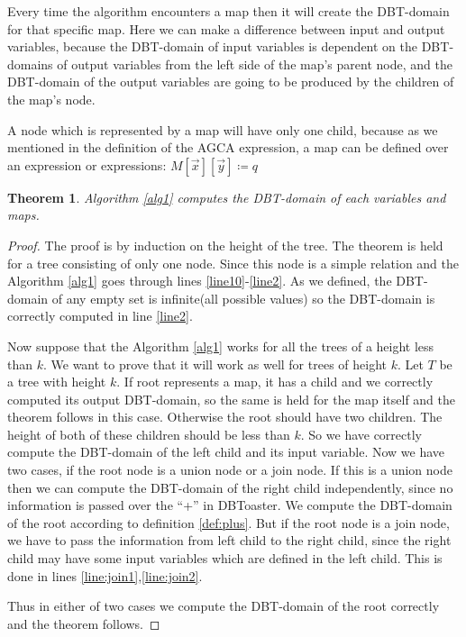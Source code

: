 \documentclass[12pt]{article}
\newtheorem{theorem}{Theorem}[section]
\begin{document}
Every time the algorithm encounters a map then it will create the DBT-domain for that specific map. Here we can make a difference between input and output variables, because the DBT-domain of input variables is dependent on the DBT-domains of output variables from the left side of the map's parent node, and the DBT-domain of the output variables are going to be produced by the children of the map's node. %

A node which is represented by a map will have only one child, because as we mentioned in the definition of the AGCA expression, a map can be defined over an expression or expressions: $M[\vec{x}][\vec{y}]\coloneqq q$
\begin{theorem}
Algorithm \ref{alg1} computes the DBT-domain of each variables and maps.
\end{theorem}

\begin{proof}
The proof is by induction on the height of the tree. The theorem is held for a tree consisting of only one node. Since this node is a simple relation and the Algorithm \ref{alg1} goes  through lines \ref{line10}-\ref{line2}. As we defined, the DBT-domain of any empty set is infinite(all possible values) so the DBT-domain is correctly computed in line \ref{line2}.

Now suppose that the Algorithm \ref{alg1} works for all the trees of a height less than $k$. We want to prove that it will work as well for trees of height $k$. Let $T$ be a tree with height $k$. If root represents a map, it has a child and we correctly computed its output DBT-domain, so the same is held for the map itself and the theorem follows in this case. Otherwise
the root should have two children. The height of both of these children should be less than $k$. So we have correctly compute the DBT-domain of the left child and its input variable. Now we have two cases, if the root node is a union node or a join node. If this is a union node then we can compute the DBT-domain of the right child independently, since no information is passed over the ``+'' in DBToaster\cite{1}. We compute the DBT-domain of the root according to definition \eqref{def:plus}. But if the root node is a join node, we have to pass the information from left child to the right child, since the right child may have some input variables which are defined in the left child. This is done in lines \ref{line:join1},\ref{line:join2}.\par
Thus in either of two cases we compute the DBT-domain of the root correctly and the theorem follows.
\end{proof}
\end{document}
